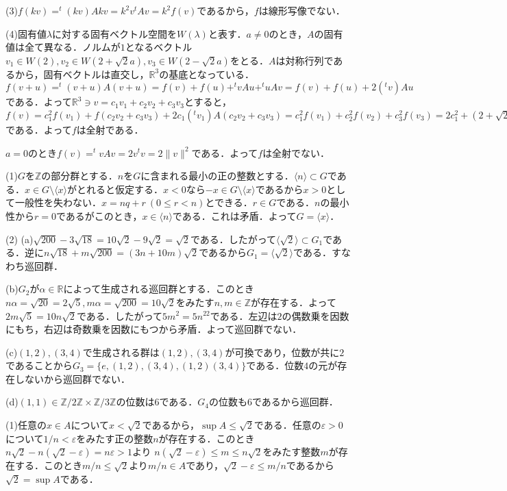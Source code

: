 \documentclass[
		book,
		head_space=20mm,
		foot_space=20mm,
		gutter=10mm,
		line_length=190mm
]{jlreq}
\begin{document}
(3)$f(kv)=^t(kv)Akv=k^2v^tAv=k^2f(v)$であるから，$f$は線形写像でない．

(4)固有値$\lambda$に対する固有ベクトル空間を$W(\lambda)$と表す．$a\neq 0$のとき，$A$の固有値は全て異なる．ノルムが$1$となるベクトル$v_1 \in W(2),v_2 \in W(2+\sqrt{2}a),v_3 \in W(2-\sqrt{2}a)$をとる．$A$は対称行列であるから，固有ベクトルは直交し，$\mathbb{R}^3$の基底となっている．
$f(v+u)=^t(v+u)A(v+u)=f(v)+f(u)+^tvAu+^tuAv=f(v)+f(u)+2 (^tv)Au$である．よって$\mathbb{R}^3 \ni v=c_1v_1+c_2v_2+c_3v_3$とすると，
$f(v)=c_1^2f(v_1)+f(c_2v_2+c_3v_3)+2c_1(^tv_1)A(c_2v_2+c_3v_3)=c_1^2f(v_1)+c_2^2f(v_2)+c_3^2f(v_3)=2c_1^2+(2+\sqrt{2}a)c_2^2+(2-\sqrt{2}a)c_3^2$である．よって$f$は全射である．

$a=0$のとき$f(v)=^tvAv=2v^tv=2\|v\|^2$である．よって$f$は全射でない．

(1)$G$を$\mathbb{Z}$の部分群とする．$n$を$G$に含まれる最小の正の整数とする．$\langle n \rangle\subset G$である．$x \in G \setminus \langle x \rangle$がとれると仮定する．$x<0$なら$-x \in G \setminus \langle x \rangle$であるから$x>0$として一般性を失わない．$x=nq+r\ (0\leq r<n)$とできる．$r\in G$である．$n$の最小性から$r=0$であるがこのとき，$x \in \langle n \rangle$である．これは矛盾．よって$G= \langle x \rangle$．

(2)
(a)$\sqrt{200}-3\sqrt{18}=10\sqrt{2}-9\sqrt{2}=\sqrt{2}$である．したがって$\langle \sqrt{2} \rangle \subset G_1$である．逆に$n \sqrt{18}+m\sqrt{200}=(3n+10m)\sqrt{2}$であるから$G_1=\langle \sqrt{2} \rangle$である．すなわち巡回群．

(b)$G_2$が$\alpha \in \mathbb{R}$によって生成される巡回群とする．このとき$n\alpha=\sqrt{20}=2\sqrt{5},m\alpha=\sqrt{200}=10\sqrt{2}$をみたす$n,m \in \mathbb{Z}$が存在する．よって$2m\sqrt{5}=10n\sqrt{2}$である．したがって$5m^2=5n^22$である．左辺は$2$の偶数乗を因数にもち，右辺は奇数乗を因数にもつから矛盾．よって巡回群でない．

(c)$(1,2),(3,4)$で生成される群は$(1,2),(3,4)$が可換であり，位数が共に$2$であることから$G_3=\{ e,(1,2),(3,4),(1,2)(3,4)\}$である．位数$4$の元が存在しないから巡回群でない．

(d)$(1,1) \in \mathbb{Z}/2 \mathbb{Z} \times \mathbb{Z}/3 \mathbb{Z}$の位数は$6$である．$G_4$の位数も$6$であるから巡回群．

(1)任意の$x \in A$について$x < \sqrt{2}$であるから，$\sup A \le \sqrt{2}$である．任意の$\varepsilon>0$について$1/n < \varepsilon$をみたす正の整数$n$が存在する．このとき$n\sqrt{2}-n(\sqrt{2}-\varepsilon)=n\varepsilon>1$より
$n(\sqrt{2}-\varepsilon)\le m\le n\sqrt{2}$をみたす整数$m$が存在する．このとき$m/n \le \sqrt{2}$より$m/n \in A$であり，$\sqrt{2}-\varepsilon\le m/n$であるから$\sqrt{2}=\sup A$である．
\end{document}
